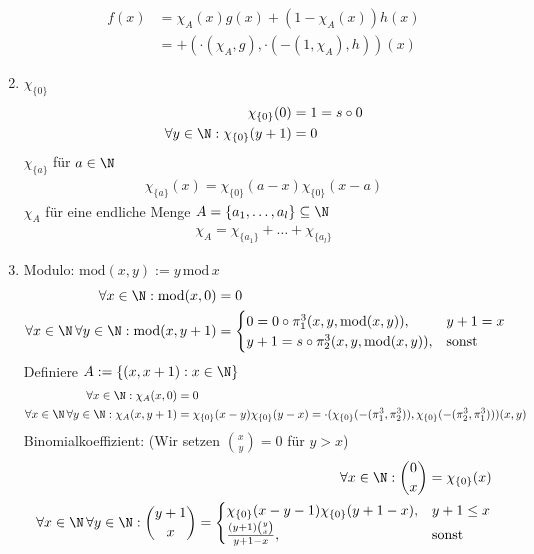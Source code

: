 \begin{solution}
\begin{enumerate}
\begin{align*}
			f(x) &= \chi_A(x) g(x) + (1 - \chi_A(x)) h(x) \\
			&= +(\cdot(\chi_A,g), \cdot(-(1,\chi_A),h))(x)
			\end{align*}
		\item $\chi_{\{0\}}$
			\begin{align*}
			\chi_{\{0\}}(0) &= 1 = s\circ 0 \\
			\forall y \in \N: \chi_{\{0\}}(y + 1) &= 0
			\end{align*}
		$\chi_{\{a\}}$ für $a \in \N$
			\begin{align*}
			\chi_{\{a\}}(x) = \chi_{\{0\}}(a - x) \chi_{\{0\}}(x - a)
			\end{align*}
		$\chi_A$ für eine endliche Menge $A = \{a_1, \dots, a_l\} \subseteq \N$
			\begin{align*}
			\chi_A = \chi_{\{a_1\}} + \dots + \chi_{\{a_l\}}
			\end{align*}
		\item
			Modulo: $\mathrm{mod}(x,y) := y\, \mathrm{mod}\, x$
			\begin{align*}
				\forall x \in \N: \mathrm{mod}(x,0) &= 0 \\
				\forall x \in \N\, \forall y \in \N: \mathrm{mod}(x,y+1) &=
				\begin{cases}
					0 = 0\circ \pi_1^3(x,y,\mathrm{mod}(x,y)), & y+1 = x \\
					y+1 = s\circ\pi_2^3(x,y,\mathrm{mod}(x,y)), & \text{sonst}
				\end{cases}
			\end{align*}
			Definiere $A := \{(x,x+1): x \in \N\}$
			\begin{align*}
				\forall x \in \N: \chi_A(x,0) &= 0 \\
				\forall x \in \N\,\forall y \in \N: \chi_A(x,y+1) &= \chi_{\{0\}}(x-y)\chi_{\{0\}}(y-x)
				= \cdot(\chi_{\{0\}}(-(\pi_1^3,\pi_2^3)),\chi_{\{0\}}(-(\pi_2^3,\pi_1^3)))(x,y)
			\end{align*}
			Binomialkoeffizient: (Wir setzen $\binom{x}{y} = 0$ für $y > x$)
			\begin{align*}
				\forall x \in \N: \binom{0}{x} = \chi_{\{0\}}(x) \\
				\forall x \in \N\,\forall y \in \N: \binom{y+1}{x} = \begin{cases}
					\chi_{\{0\}}(x-y-1)\chi_{\{0\}}(y+1-x), & y+1 \leq x \\
					\frac{(y+1)\binom{y}{x}}{y+1-x}, & \text{sonst}
				\end{cases}
			\end{align*}

\end{enumerate}
\end{solution}
